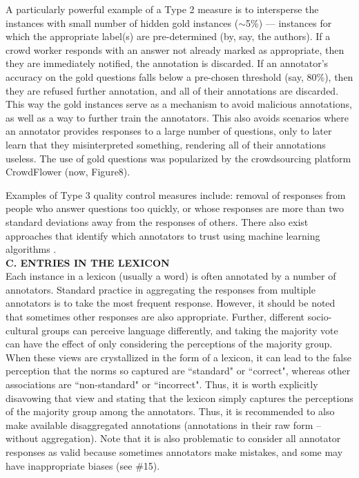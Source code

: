 \documentclass[11pt]{article}
\begin{document}
A particularly powerful example of a Type 2 measure is to intersperse the instances with small number  of hidden gold instances ($\sim$5\%) --- instances for which the appropriate label(s) are pre-determined (by, say, the authors). 
If a crowd worker responds with an answer not already marked as appropriate, then they are immediately notified, the annotation is discarded. If an annotator's accuracy on the gold questions falls below a pre-chosen threshold (say, 80\%), then they are refused further annotation, 
and all of their annotations are discarded. 
This way the gold instances serve as a mechanism to avoid malicious annotations, 
as well as a way to further train the annotators. This also avoids scenarios where an annotator provides responses to a large number of questions, only to later learn that they misinterpreted something, rendering all of their annotations useless.
The use of gold questions was popularized by the crowdsourcing platform CrowdFlower (now, Figure8). 

Examples of Type 3 quality control measures include: removal of responses from people who answer questions too quickly, or whose responses are more than two standard deviations away from the responses of others. There also exist approaches that identify which annotators to trust using machine learning algorithms \cite{raykar2012eliminating,hovy-etal-2013-learning}. \\[-3pt]

\noindent \textbf{C. ENTRIES IN THE LEXICON}\\[-8pt]


 Each instance in a lexicon (usually a word) is often annotated by a number of annotators. Standard practice in aggregating the responses from multiple annotators is to take the most frequent response. However, it should be noted that sometimes other responses are also appropriate. Further, different socio-cultural groups can perceive language differently, and taking the majority vote can have the effect of only considering the perceptions of the majority group. When these views are crystallized in the form of a lexicon, it can lead to the false perception that the norms so captured are ``standard" or ``correct", whereas other associations are ``non-standard" or ``incorrect". Thus, it is worth explicitly disavowing that view and stating that the lexicon simply captures the perceptions of the majority group among the annotators. 
Thus, it is recommended to also make available disaggregated annotations (annotations in their raw form -- without aggregation). %
Note that it is also problematic to consider 
all annotator responses as valid because sometimes annotators make mistakes, and some may have inappropriate biases (see \#15).\\[-10pt]
\end{document}
